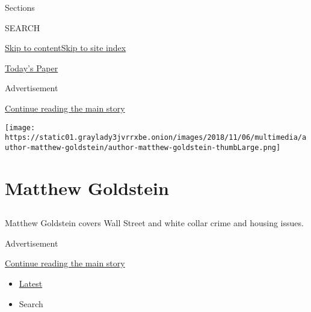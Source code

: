 Sections

SEARCH

\protect\hyperlink{site-content}{Skip to
content}\protect\hyperlink{site-index}{Skip to site index}

\href{https://myaccount.nytimes3xbfgragh.onion/auth/login?response_type=cookie\&client_id=vi}{}

\href{https://www.nytimes3xbfgragh.onion/section/todayspaper}{Today's
Paper}

Advertisement

\protect\hyperlink{after-top}{Continue reading the main story}

\texttt{[image: https://static01.graylady3jvrrxbe.onion/images/2018/11/06/multimedia/author-matthew-goldstein/author-matthew-goldstein-thumbLarge.png]}

\hypertarget{matthew-goldstein}{%
\section{Matthew Goldstein}\label{matthew-goldstein}}

\hypertarget{section}{%
\subsection{}\label{section}}

Matthew Goldstein covers Wall Street and white collar crime and housing
issues.

Advertisement

\protect\hyperlink{after-mid1}{Continue reading the main story}

\begin{itemize}
\tightlist
\item
  \protect\hyperlink{stream-panel}{Latest}
\item
  Search
\end{itemize}

